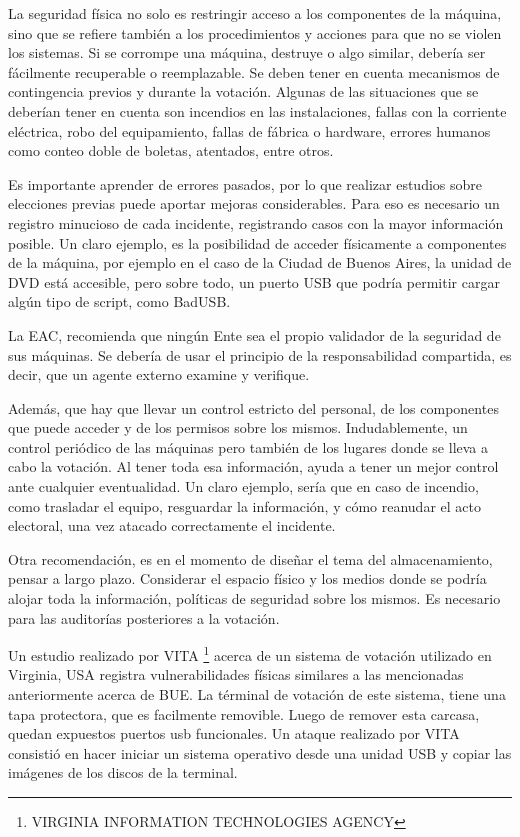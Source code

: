 La seguridad física no solo es restringir acceso a los componentes de la máquina, sino que se refiere también a los procedimientos y acciones para que no se violen los sistemas. Si se corrompe una máquina, destruye o algo similar, debería ser fácilmente recuperable o reemplazable. Se deben tener en cuenta mecanismos de contingencia previos y durante la votación. Algunas de las situaciones que se deberían tener en cuenta son incendios en las instalaciones, fallas con la corriente eléctrica, robo del equipamiento, fallas de fábrica o hardware, errores humanos como conteo doble de boletas, atentados, entre otros.

Es importante aprender de errores pasados, por lo que realizar estudios sobre elecciones previas puede aportar mejoras considerables. Para eso es necesario un registro minucioso de cada incidente, registrando casos con la mayor información posible. Un claro ejemplo, es la posibilidad de acceder físicamente a componentes de la máquina, por ejemplo en el caso de la Ciudad de Buenos Aires, la unidad de DVD está accesible, pero sobre todo, un puerto USB que podría permitir cargar algún tipo de script, como BadUSB.

La EAC, recomienda que ningún Ente sea el propio validador de la seguridad de sus máquinas. Se debería de usar el principio de la responsabilidad compartida, es decir, que un agente externo examine y verifique.

Además, que hay que llevar un control estricto del personal, de los componentes que puede acceder y de los permisos sobre los mismos. Indudablemente, un control periódico de las máquinas pero también de los lugares donde se lleva a cabo la votación. Al tener toda esa información, ayuda a tener un mejor control ante cualquier eventualidad. Un claro ejemplo, sería que en caso de incendio, como trasladar el equipo, resguardar la información, y cómo reanudar el acto electoral, una vez atacado correctamente el incidente.

Otra recomendación, es en el momento de diseñar el tema del almacenamiento, pensar a largo plazo. Considerar el espacio físico y los medios donde se podría alojar toda la información, políticas de seguridad sobre los mismos. Es necesario para las auditorías posteriores a la votación.

Un estudio realizado por VITA \footnote{VIRGINIA INFORMATION TECHNOLOGIES AGENCY} acerca de un sistema de votación utilizado en Virginia, USA\cite{vita} registra vulnerabilidades físicas similares a las mencionadas anteriormente acerca de BUE.
La términal de votación de este sistema, tiene una tapa protectora, que es facilmente removible. Luego de remover esta carcasa, quedan expuestos puertos usb funcionales. Un ataque realizado por VITA consistió en hacer iniciar un sistema operativo desde una unidad USB y copiar las imágenes de los discos de la terminal.

